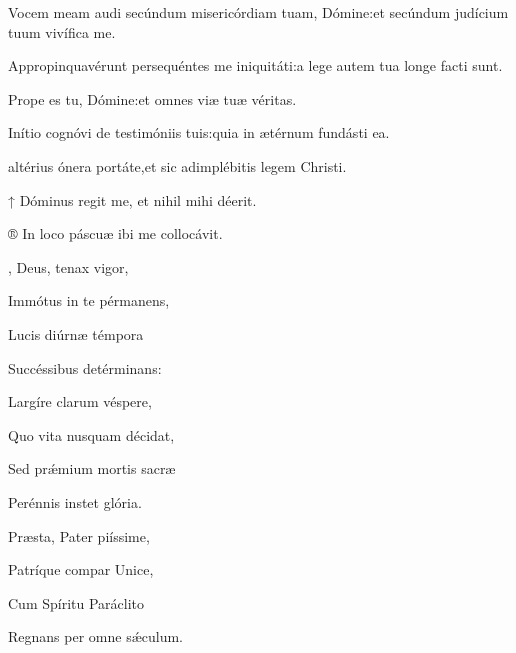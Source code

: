 \begin{multicols}{2}
Vocem meam audi secúndum misericórdiam tuam, Dómine\thinspace:\GreStarNbsp et secúndum judícium tuum vivífica me.

Appropinquavérunt persequéntes me iniquitá\-ti\thinspace:\GreStarNbsp a lege autem tua longe facti sunt.

Prope es tu, Dómine\thinspace:\GreStarNbsp et omnes viæ tuæ véritas.

Inítio cognóvi de testimóniis tuis\thinspace:\GreStarNbsp quia in ætérnum fundásti ea.



 altérius ónera portáte,\GreStarNbsp et sic adimplébitis legem Christi.

\vspace{0.3cm}

↑ Dóminus regit me, et nihil mihi déerit.

® In loco páscuæ ibi me collocávit.



\Ligne



\vspace{0.2cm}

\Hymne{}

\setlength{\leftskip}{0cm}
, Deus, tenax vigor,

\Hymne{}

Immótus in te pérmanens,

Lucis diúrnæ témpora

Succéssibus detérminans\thinspace:

\vspace{0.3cm}

Largíre clarum véspere,

Quo vita nusquam décidat,

Sed prǽmium mortis sacræ

Perénnis instet glória.

\vspace{0.3cm}

Præsta, Pater piíssime,

Patríque compar Unice,

Cum Spíritu Paráclito

Regnans per omne sǽculum.


\end{multicols}
